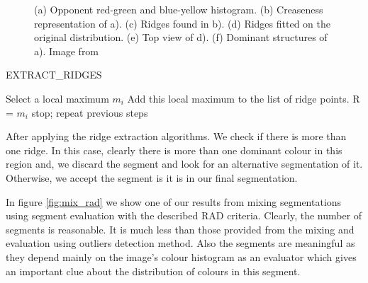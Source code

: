 \documentclass[twoside,11pt]{article}
\begin{document}
\begin{figure}[!t]
\caption{(a) Opponent red-green and blue-yellow histogram. (b) Creaseness
representation of a). (c) Ridges found in b). (d) Ridges fitted on the original
distribution. (e) Top view of d). (f) Dominant structures of a). Image from
\cite{1478239}}
\label{fig:ridges_exp}
\end{figure}

\begin{algorithm}
\caption{EXTRACT\_RIDGES}
\label{alg:ridgeext}
\begin{algorithmic}
\STATE Select a local maximum $m_{i}$
\STATE Add this local maximum to the list of ridge points. R = {$m_{i}$}
\STATE stop;
\ELSE
\STATE repeat previous steps
\ENDIF
\end{algorithmic}
\end{algorithm}

After applying the ridge extraction algorithms. We check if there is more than one
ridge. In this case, clearly there is more than one dominant colour in this
region and, we discard the segment and look for an alternative segmentation of it.
Otherwise, we accept the segment is it is in our final segmentation.

In figure \ref{fig:mix_rad} we show one of our results from mixing segmentations
using segment evaluation with the described RAD criteria. Clearly, the number of
segments is reasonable. It is much less than those provided from the mixing and
evaluation using outliers detection method. Also the segments are meaningful as
they depend mainly on the image's colour histogram as an evaluator which gives
an important
clue about the distribution of colours in this segment.
\end{document}
